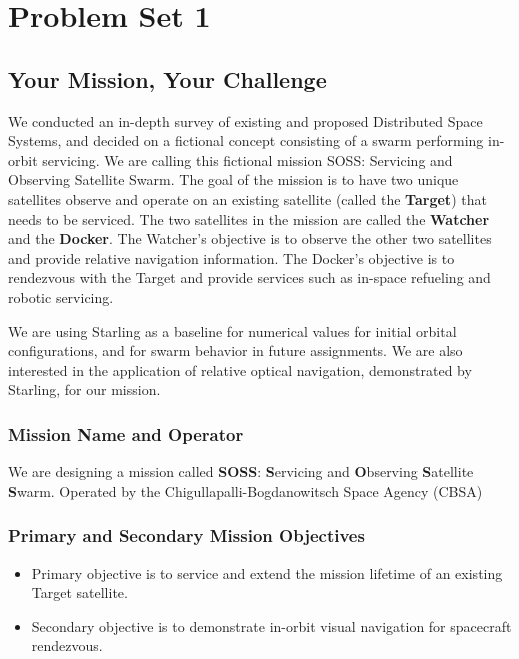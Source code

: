 \section{Problem Set 1}
\subsection{Your Mission, Your Challenge}

We conducted an in-depth survey of existing and proposed Distributed Space Systems, and decided on a fictional concept consisting of a swarm performing in-orbit servicing. We are calling this fictional mission SOSS: Servicing and Observing Satellite Swarm. The goal of the mission is to have two unique satellites observe and operate on an existing satellite (called the \textbf{Target}) that needs to be serviced. The two satellites in the mission are called the \textbf{Watcher} and the \textbf{Docker}. The Watcher's objective is to observe the other two satellites and provide relative navigation information. The Docker's objective is to rendezvous with the Target and provide services such as in-space refueling and robotic servicing.

We are using Starling \cite{krugerorbit} as a baseline for numerical values for initial orbital configurations, and for swarm behavior in future assignments. We are also interested in the application of relative optical navigation, demonstrated by Starling, for our mission.

\subsubsection{Mission Name and Operator}
We are designing a mission called \textbf{SOSS}: \textbf{S}ervicing and \textbf{O}bserving \textbf{S}atellite \textbf{S}warm. Operated by the Chigullapalli-Bogdanowitsch Space Agency (CBSA)

\subsubsection{Primary and Secondary Mission Objectives}
\begin{itemize}
    \item Primary objective is to service and extend the mission lifetime of an existing Target satellite.
    \item Secondary objective is to demonstrate in-orbit visual navigation for spacecraft rendezvous.
\end{itemize}
    
